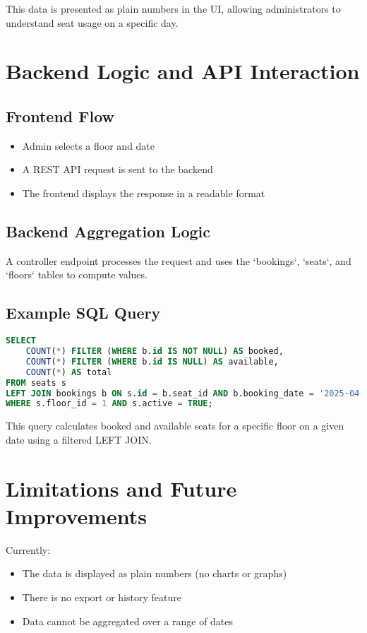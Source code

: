 \documentclass[12pt,a4paper]{report}
\begin{document}
This data is presented as plain numbers in the UI, allowing administrators to understand seat usage on a specific day.

\section{Backend Logic and API Interaction}

\subsection*{Frontend Flow}
\begin{itemize}
    \item Admin selects a floor and date
    \item A REST API request is sent to the backend
    \item The frontend displays the response in a readable format
\end{itemize}

\subsection*{Backend Aggregation Logic}
A controller endpoint processes the request and uses the `bookings`, `seats`, and `floors` tables to compute values.

\subsection*{Example SQL Query}

\begin{lstlisting}[language=SQL]
SELECT 
    COUNT(*) FILTER (WHERE b.id IS NOT NULL) AS booked,
    COUNT(*) FILTER (WHERE b.id IS NULL) AS available,
    COUNT(*) AS total
FROM seats s
LEFT JOIN bookings b ON s.id = b.seat_id AND b.booking_date = '2025-04-10'
WHERE s.floor_id = 1 AND s.active = TRUE;
\end{lstlisting}

This query calculates booked and available seats for a specific floor on a given date using a filtered LEFT JOIN.

\section{Limitations and Future Improvements}

Currently:
\begin{itemize}
    \item The data is displayed as plain numbers (no charts or graphs)
    \item There is no export or history feature
    \item Data cannot be aggregated over a range of dates
\end{itemize}
\end{document}
